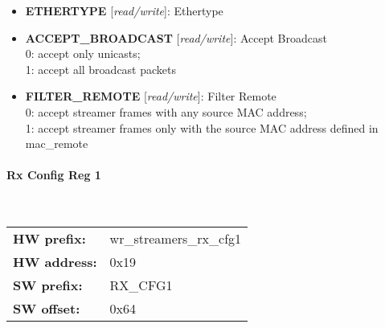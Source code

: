 \vspace{12pt}
\noindent
{}

\begin{itemize}
\item \begin{small}
{\bf 
ETHERTYPE
} [\emph{read/write}]: Ethertype
\end{small}
\item \begin{small}
{\bf 
ACCEPT\_BROADCAST
} [\emph{read/write}]: Accept Broadcast
\\
0: accept only unicasts; \\      1: accept all broadcast packets
\end{small}
\item \begin{small}
{\bf 
FILTER\_REMOTE
} [\emph{read/write}]: Filter Remote
\\
0: accept streamer frames with any source MAC address; \\      1: accept streamer frames only with the source MAC address defined in mac\_remote
\end{small}
\end{itemize}
\paragraph*{Rx Config Reg 1}\mbox{}\\\vskip 6pt
\begin{tabular}{l l }
{\bf HW prefix:}  & wr\_streamers\_rx\_cfg1\\
{\bf HW address:}  & 0x19\\
{\bf SW prefix:}  & RX\_CFG1\\
{\bf SW offset:}  & 0x64\\
\end{tabular}


